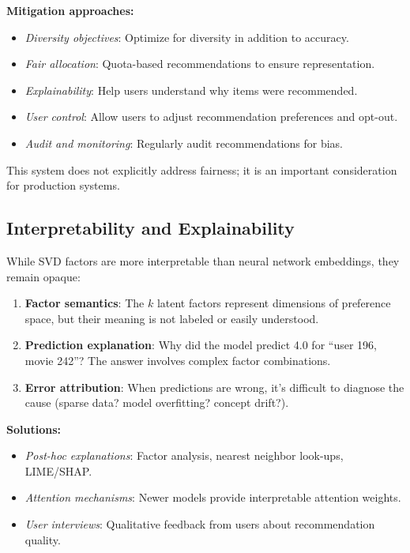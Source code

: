 \textbf{Mitigation approaches:}
\begin{itemize}
  \item \textit{Diversity objectives}: Optimize for diversity in addition to accuracy.
  
  \item \textit{Fair allocation}: Quota-based recommendations to ensure representation.
  
  \item \textit{Explainability}: Help users understand why items were recommended.
  
  \item \textit{User control}: Allow users to adjust recommendation preferences and opt-out.
  
  \item \textit{Audit and monitoring}: Regularly audit recommendations for bias.
\end{itemize}

This system does not explicitly address fairness; it is an important consideration for production systems.

\subsection{Interpretability and Explainability}

While SVD factors are more interpretable than neural network embeddings, they remain opaque:

\begin{enumerate}
  \item \textbf{Factor semantics}: The $k$ latent factors represent dimensions of preference space, but 
  their meaning is not labeled or easily understood.
  
  \item \textbf{Prediction explanation}: Why did the model predict 4.0 for ``user 196, movie 242''? 
  The answer involves complex factor combinations.
  
  \item \textbf{Error attribution}: When predictions are wrong, it's difficult to diagnose the cause 
  (sparse data? model overfitting? concept drift?).
\end{enumerate}

\textbf{Solutions:}
\begin{itemize}
  \item \textit{Post-hoc explanations}: Factor analysis, nearest neighbor look-ups, LIME/SHAP.
  
  \item \textit{Attention mechanisms}: Newer models provide interpretable attention weights.
  
  \item \textit{User interviews}: Qualitative feedback from users about recommendation quality.
\end{itemize}


